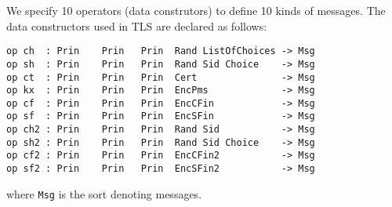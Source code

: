 \documentclass[a4paper,fleqn]{cas-dc}
\begin{document}
We specify 10 operators (data construtors) to define 10 kinds of messages. The data constructors used in TLS are declared as follows:
\begin{small}
		\begin{verbatim}
op ch  : Prin    Prin   Prin  Rand ListOfChoices -> Msg
op sh  : Prin    Prin   Prin  Rand Sid Choice    -> Msg
op ct  : Prin    Prin   Prin  Cert               -> Msg
op kx  : Prin    Prin   Prin  EncPms             -> Msg
op cf  : Prin    Prin   Prin  EncCFin            -> Msg
op sf  : Prin    Prin   Prin  EncSFin            -> Msg
op ch2 : Prin    Prin   Prin  Rand Sid           -> Msg
op sh2 : Prin    Prin   Prin  Rand Sid Choice    -> Msg
op cf2 : Prin    Prin   Prin  EncCFin2           -> Msg
op sf2 : Prin    Prin   Prin  EncSFin2           -> Msg
		\end{verbatim}
	\end{small}
where \verb!Msg! is the sort denoting messages. 
\end{document}
